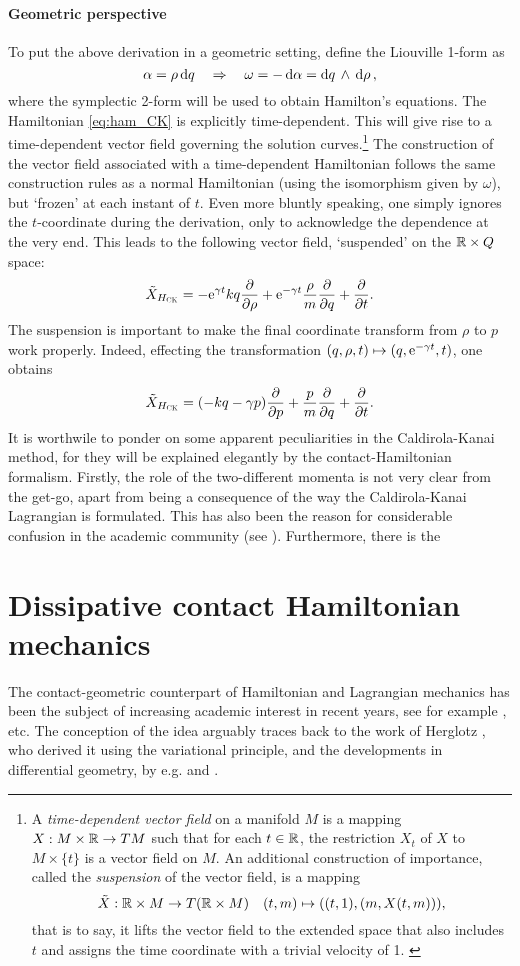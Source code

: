 \paragraph{Geometric perspective}
To put the above derivation in a geometric setting, define the Liouville 1-form as
$$ \alpha = \rho\dd{q} \quad \Rightarrow \quad \omega = -\dd{\alpha} =  \dd{q}\,\wedge\,\dd{\ensuremath{\rho}} ,$$
where the symplectic 2-form will be used to obtain Hamilton's equations. The Hamiltonian \cref{eq:ham_CK} is explicitly time-dependent. This will give rise to a time-dependent vector field governing the solution curves.\footnote
{A \emph{time-dependent vector field} on a manifold $M$ is a mapping $X: M\times\mathbb{R} \to TM$ such that for each $t \in \mathbb{R}$, the restriction $X_t$ of $X$ to $M \times \{t\}$ is a vector field on $M$. \cite{Libermann1987} An additional construction of importance, called the \emph{suspension} of the vector field, is a mapping $$ \tilde{X}: \mathbb{R} \times M \to T(\mathbb{R} \times M) \quad (t, m) \mapsto ((t, 1), (m, X(t, m))),$$ that is to say, it lifts the vector field to the extended space that also includes $t$ and assigns the time coordinate with a trivial velocity of 1. \cite{Abraham1978}}
The construction of the vector field associated with a time-dependent Hamiltonian follows the same construction rules as a normal Hamiltonian (using the isomorphism given by $\omega$), but `frozen' at each instant of $t$. Even more bluntly speaking, one simply ignores the $t$-coordinate during the derivation, only to acknowledge the dependence at the very end. This leads to the following vector field, `suspended' on the $\mathbb{R}\times Q$ space:
$$ \tilde{X}_{H_\text{\tiny{\textsc{CK}}}} = -\mathrm{e}^{\gamma t}kq\pdv{}{\ensuremath{\rho}} + \mathrm{e}^{-\gamma t}\frac{\rho}{m}\pdv{}{q} + \pdv{}{t}.$$
The suspension is important to make the final coordinate transform from $\rho$ to $p$ work properly. Indeed, effecting the transformation $(q, \rho, t) \mapsto (q, \mathrm{e}^{-\gamma t}, t)$, one obtains
$$ \tilde{X}_{H_\text{\tiny{\textsc{CK}}}} = \qty(-kq - \gamma p)\pdv{}{p} + \frac{p}{m}\pdv{}{q} + \pdv{}{t}.$$
It is worthwile to ponder on some apparent peculiarities in the Caldirola-Kanai method, for they will be explained elegantly by the contact-Hamiltonian formalism. Firstly, the role of the two-different momenta is not very clear from the get-go, apart from being a consequence of the way the Caldirola-Kanai Lagrangian is formulated. This has also been the reason for considerable confusion in the academic community (see \citet{Schuch1997}). Furthermore, there is the 

\section{Dissipative contact Hamiltonian mechanics}
The contact-geometric counterpart of Hamiltonian and Lagrangian mechanics has been the subject of increasing academic interest in recent years, see for example \citet{VanderSchaft2021a,VanderSchaft2018,Maschke2018,Bravetti2017,DeLeon2020}, etc. The conception of the idea arguably traces back to the work of Herglotz \cite{Guenther1996}, who derived it using the variational principle, and the developments in differential geometry, by e.g. \citet{Arnold1989} and \citet{Libermann1987}.

